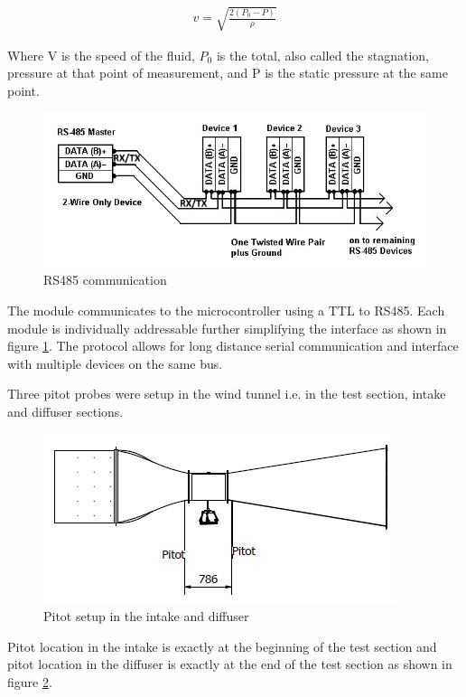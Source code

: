 \begin{ceqn}
	\begin{align}
		v = \sqrt{\frac{2(P_{0} - P)}{\rho}}
	\end{align}
\end{ceqn}

Where V is the speed of the fluid, $P_{0}$ is the total, also called the stagnation, pressure at that point of measurement, and P is the static pressure at the same point.

\begin{center}
	\begin{figure}[H]
		\centering
		\includegraphics{Figures/modbus}
		\caption[RS485 communication]{RS485 communication}
		\label{fig:rs485}
	\end{figure}
\end{center}
The module communicates to the microcontroller using a TTL to RS485. Each module is individually addressable further simplifying the interface as shown in figure \ref{fig:rs485}.
The protocol allows for long distance serial communication and interface with multiple devices on the same bus.

Three pitot probes were setup in the wind tunnel i.e. in the test section, intake and diffuser sections.
\begin{center}
	\begin{figure}[H]
		\centering
		\includegraphics{Figures/wt and pitot.JPG}
		\caption[Pitot setup]{Pitot setup in the intake and diffuser}
		\label{pitot loc}
	\end{figure}
\end{center}
Pitot location in the intake is exactly at the beginning of the test section and pitot location in the diffuser
is exactly at the end of the test section as shown in figure \ref{pitot loc}.

